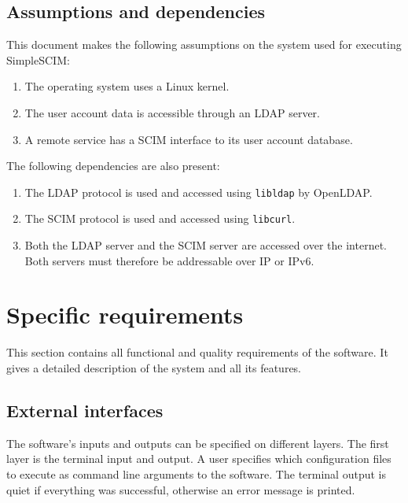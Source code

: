 \documentclass[12pt,twoside,a4paper,titlepage]{article}
\begin{document}
  \subsection{Assumptions and dependencies}

  This document makes the following assumptions on the system used
  for executing SimpleSCIM:

  \begin{enumerate}
   \item
    The operating system uses a Linux kernel.

   \item
    The user account data is accessible through an LDAP server.

   \item
    A remote service has a SCIM interface to its user account
    database.
  \end{enumerate}

  \noindent
  The following dependencies are also present:

  \begin{enumerate}
   \item
    The LDAP protocol is used and accessed using \texttt{libldap} by
    OpenLDAP.

   \item
    The SCIM protocol is used and accessed using \texttt{libcurl}.

   \item
    Both the LDAP server and the SCIM server are accessed over the
    internet. Both servers must therefore be addressable over IP or
    IPv6.
  \end{enumerate}

 \newpage

 \section{Specific requirements}
 \label{section:specific-requirements}

 This section contains all functional and quality requirements of the
 software. It gives a detailed description of the system and all its
 features.

  \subsection{External interfaces}

  The software's inputs and outputs can be specified on different
  layers. The first layer is the terminal input and output. A user
  specifies which configuration files to execute as command line
  arguments to the software. The terminal output is quiet if
  everything was successful, otherwise an error message is printed.
\end{document}
